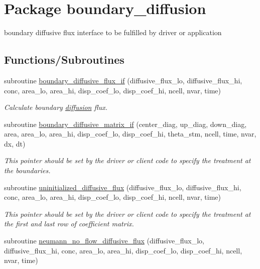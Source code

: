 \hypertarget{a00051}{
\section{Package boundary\_\-diffusion}
\label{a00051}
}
boundary diffusive flux interface to be fulfilled by driver or application  


\subsection*{Functions/Subroutines}
\begin{CompactItemize}
\item 
subroutine \hyperlink{a00051_5540992a4e125d1b4affb67bb805df11}{boundary\_\-diffusive\_\-flux\_\-if} (diffusive\_\-flux\_\-lo, diffusive\_\-flux\_\-hi, conc, area\_\-lo, area\_\-hi, disp\_\-coef\_\-lo, disp\_\-coef\_\-hi, ncell, nvar, time)
\begin{CompactList}\small\item\em Calculate boundary \hyperlink{a00053}{diffusion} flux. \item\end{CompactList}\item 
subroutine \hyperlink{a00051_781f25a83683631c224d3f258b12590b}{boundary\_\-diffusive\_\-matrix\_\-if} (center\_\-diag, up\_\-diag, down\_\-diag, area, area\_\-lo, area\_\-hi, disp\_\-coef\_\-lo, disp\_\-coef\_\-hi, theta\_\-stm, ncell, time, nvar, dx, dt)
\begin{CompactList}\small\item\em This pointer should be set by the driver or client code to specify the treatment at the boundaries. \item\end{CompactList}\item 
subroutine \hyperlink{a00051_c27cf26f93c52ce9d432267264793736}{uninitialized\_\-diffusive\_\-flux} (diffusive\_\-flux\_\-lo, diffusive\_\-flux\_\-hi, conc, area\_\-lo, area\_\-hi, disp\_\-coef\_\-lo, disp\_\-coef\_\-hi, ncell, nvar, time)
\begin{CompactList}\small\item\em This pointer should be set by the driver or client code to specify the treatment at the first and last row of coefficient matrix. \item\end{CompactList}\item 
subroutine \hyperlink{a00051_1e0b364f397107a8d87850fedede417a}{neumann\_\-no\_\-flow\_\-diffusive\_\-flux} (diffusive\_\-flux\_\-lo, diffusive\_\-flux\_\-hi, conc, area\_\-lo, area\_\-hi, disp\_\-coef\_\-lo, disp\_\-coef\_\-hi, ncell, nvar, time)

\end{CompactItemize}
